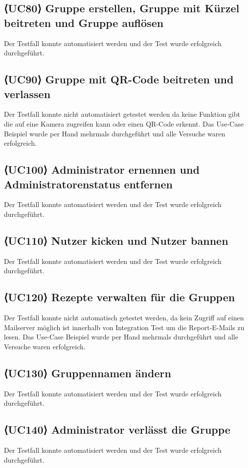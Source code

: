 \documentclass{qualitätssicherungsheft}
\begin{document}
\subsection{⟨UC80⟩ Gruppe erstellen, Gruppe mit Kürzel beitreten und Gruppe auflösen}
Der Testfall konnte automatisiert werden und der Test wurde erfolgreich durchgeführt. 
\subsection{⟨UC90⟩ Gruppe mit QR-Code beitreten und verlassen}
Der Testfall konnte nicht automatisiert getestet werden da keine Funktion gibt die auf eine Kamera zugreifen kann oder einen QR-Code erkennt. Das Use-Case Beispiel wurde per Hand mehrmals durchgeführt und alle Versuche waren erfolgreich.
\subsection{⟨UC100⟩ Administrator ernennen und Administratorenstatus entfernen}
Der Testfall konnte automatisiert werden und der Test wurde erfolgreich durchgeführt.
\subsection{⟨UC110⟩ Nutzer kicken und Nutzer bannen}
Der Testfall konnte automatisiert werden und der Test wurde erfolgreich durchgeführt.
\subsection{⟨UC120⟩ Rezepte verwalten für die Gruppen}
Der Testfall konnte nicht automatisch getestet werden, da kein Zugriff auf einen Mailserver möglich ist innerhalb von Integration Test um die Report-E-Mails zu lesen. Das Use-Case Beispiel wurde per Hand mehrmals durchgeführt und alle Versuche waren erfolgreich.
\subsection{⟨UC130⟩ Gruppennamen ändern}
Der Testfall konnte automatisiert werden und der Test wurde erfolgreich durchgeführt.
\subsection{⟨UC140⟩ Administrator verlässt die Gruppe}
Der Testfall konnte automatisiert werden und der Test wurde erfolgreich durchgeführt.
\end{document}
